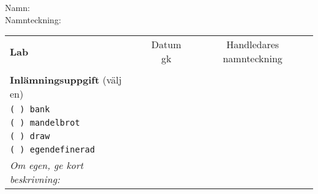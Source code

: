 \vspace{2.5em}\noindent Namn: \dotfill\\

\vspace{1em}\noindent Namnteckning: \dotfill\\

\newcommand{\LabRow}[1]{\\[-1.1em] \texttt{#1} & \dotfill &  \dotfill  \\ \addlinespace }

\begin{table}[h]
\centering
\vspace{1em}
\begin{tabular}{lcc}
\toprule \addlinespace 
{\sffamily\bfseries\small Lab} & {\sffamily\small Datum gk} &	{\sffamily\small Handledares namnteckning}\\ \addlinespace \midrule \\[-0.5em]

\addlinespace \midrule \addlinespace
{\sffamily\small {\bfseries Inlämningsuppgift} (välj en)	} & & \\ \addlinespace\addlinespace %
\texttt{( ) bank}  &  &  \\
\texttt{( ) mandelbrot} \\  
\texttt{( ) draw}  \\
\texttt{( ) egendefinerad}  \\
\textit{\small Om egen, ge kort beskrivning:}\\
\bottomrule
\end{tabular}
\end{table}